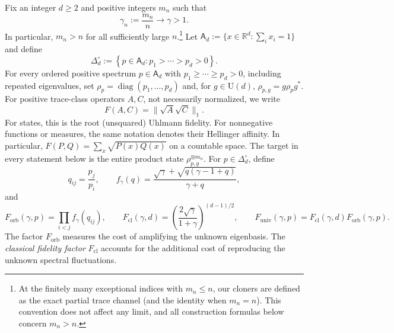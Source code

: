 \documentclass[11pt]{article}
\theoremstyle{remark}
\theoremstyle{plain}
\newcommand{\R}{\mathbb R}
\newcommand{\U}{\mathrm U}
\newcommand{\diag}{\operatorname{diag}}
\newcommand{\ot}{\otimes}
\newcommand{\Forb}{F_{\mathrm{orb}}}
\newcommand{\Fcl}{F_{\mathrm{cl}}}
\newcommand{\Funiv}{F_{\mathrm{univ}}}
\begin{document}
Fix an integer \(d\ge2\) and positive integers \(m_n\) such that
\begin{equation}\label{eq:fixed-gain-regime}
  \gamma_n:=\frac{m_n}{n}\longrightarrow\gamma>1.
\end{equation}
In particular, \(m_n>n\) for all sufficiently large \(n\).\footnote{At the
finitely many exceptional indices with \(m_n\le n\), our cloners are defined
as the exact partial trace channel (and the identity when \(m_n=n\)).  This convention
does not affect any limit, and all construction formulas below concern
\(m_n>n\).}
Let \(\mathsf A_d:=\{x\in\R^d:\sum_i x_i=1\}\) and define
\begin{equation}\label{eq:simple-spectrum-family}
  \Delta_d^\circ
  :=\left\{p\in\mathsf A_d:p_1>\cdots>p_d>0\right\}.
\end{equation}
For every ordered positive spectrum \(p\in\mathsf A_d\) with
\(p_1\ge\cdots\ge p_d>0\), including repeated eigenvalues, set
\(\rho_p=\diag(p_1,\ldots,p_d)\) and, for \(g\in\U(d)\),
\(\rho_{p,g}=g\rho_p g^*\).
For positive trace-class operators \(A,C\), not necessarily normalized, we
write
\begin{equation}\label{eq:root-fidelity-definition}
  F(A,C)=\|\sqrt A\sqrt C\|_1.
\end{equation}
For states, this is the root (unsquared) Uhlmann fidelity.  For nonnegative
functions or measures, the same notation denotes their Hellinger affinity. In
particular, \(F(P,Q)=\sum_x\sqrt{P(x)Q(x)}\) on a countable space.  The target
in every statement below is the entire product state
\(\rho_{p,g}^{\ot m_n}\).  For
\(p\in\Delta_d^\circ\), define
\begin{equation}\label{eq:pairwise-fidelity-factor}
  q_{ij}=\frac{p_j}{p_i},
  \qquad
  f_\gamma(q)
  =\frac{\sqrt\gamma+\sqrt{q(\gamma-1+q)}}{\gamma+q},
\end{equation}
and
\begin{equation}\label{eq:main-values}
  \Forb(\gamma,p)=\prod_{i<j}f_\gamma(q_{ij}),
  \qquad
  \Fcl(\gamma,d)
  =\left(\frac{2\sqrt\gamma}{1+\gamma}\right)^{(d-1)/2},
  \qquad
  \Funiv(\gamma,p)=\Fcl(\gamma,d)\Forb(\gamma,p).
\end{equation}
The factor \(\Forb\) measures the cost of amplifying the unknown eigenbasis.
The \emph{classical fidelity factor} \(\Fcl\) accounts for the additional
cost of reproducing the unknown spectral fluctuations.
\end{document}
